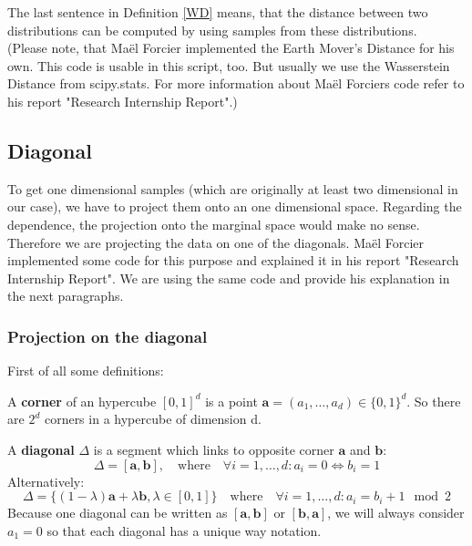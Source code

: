 The last sentence in Definition \ref{WD} means, that the distance between two distributions can be computed by using samples from these distributions.\\

(Please note, that Ma{\"e}l Forcier implemented the Earth Mover's Distance for his own. This code is usable in this script, too. But usually we use the Wasserstein Distance from scipy.stats. For more information about Ma{\"e}l Forciers code refer to his report "Research Internship Report".)

\subsection{Diagonal}\label{diag}

To get one dimensional samples (which are originally at least two dimensional in our case), we have to project them onto an one dimensional space. Regarding the dependence, the projection onto the marginal space would make no sense. Therefore we are projecting the data on one of the diagonals. Ma{\"e}l Forcier implemented some code for this purpose and explained it in his report "Research Internship Report". We are using the same code and provide his explanation in the next paragraphs.\\

\subsubsection{Projection on the diagonal}

First of all some definitions:

\begin{definition}\label{Corner}
	A \textbf{corner} of an hypercube $[0,1]^d$ is a point $\boldsymbol{a}=(a_{1},\dots,a_{d})\in\{0,1\}^d$. So there are $2^d$ corners in a hypercube of dimension d. 
\end{definition}

\begin{definition}
	A \textbf{diagonal} $\Delta$ is a segment which links to opposite corner $\boldsymbol{a}$ and $\boldsymbol{b}$:
	\begin{equation*}
		\Delta = [\boldsymbol{a},\boldsymbol{b}],\quad \textrm{where} \quad \forall i=1,\dots,d: a_{i}=0 \Leftrightarrow b_{i}=1
	\end{equation*}
	Alternatively:
	\begin{equation*}
		\Delta =\{(1-\lambda)\boldsymbol{a}+\lambda\boldsymbol{b}, \lambda \in [0,1]\} \quad \textrm{where} \quad \forall i=1,\dots,d: a_{i}=b_{i}+1\mod 2
	\end{equation*}
	Because one diagonal can be written as $[\boldsymbol{a},\boldsymbol{b}]$ or $[\boldsymbol{b},\boldsymbol{a}]$, we will always consider $a_{1}=0$ so that each diagonal has a unique way notation.
\end{definition}

